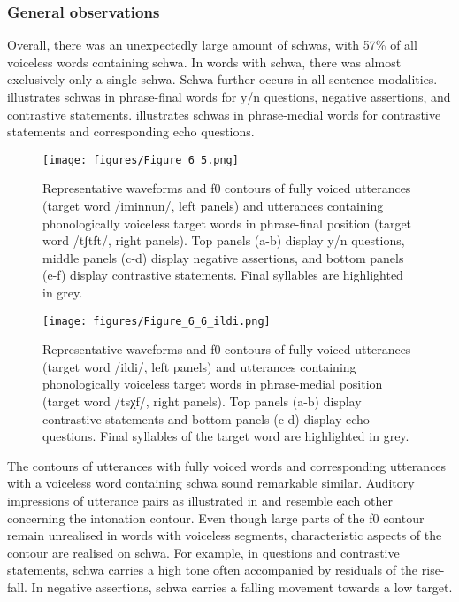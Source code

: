 \subsubsection{General observations}
Overall, there was an unexpectedly large amount of schwas, with 57\% of all voiceless words containing schwa. In words with schwa, there was almost exclusively only a single schwa. Schwa further occurs in all sentence modalities.  illustrates schwas in phrase-final words for y/n questions, negative assertions, and contrastive statements.  illustrates schwas in phrase-medial words for contrastive statements and corresponding echo questions. 

  \begin{figure}
   \texttt{[image: figures/Figure\_6\_5.png]}
  \caption{Representative waveforms and f0 contours of fully voiced utterances (target word /iminnun/, left panels) and utterances containing phonologically voiceless target words in phrase-final position (target word /tʃtft/, right panels). Top panels (a-b) display y/n questions, middle panels (c-d) display negative assertions, and bottom panels (e-f) display contrastive statements. Final syllables are highlighted in grey.}
   \label{fig:6.5}
   \end{figure}

  \begin{figure}
   
   \texttt{[image: figures/Figure\_6\_6\_ildi.png]}
  \caption{Representative waveforms and f0 contours of fully voiced utterances (target word /ildi/, left panels) and utterances containing phonologically voiceless target words in phrase-medial position (target word /tsχf/, right panels). Top panels (a-b) display contrastive statements and bottom panels (c-d) display echo questions. Final syllables of the target word are highlighted in grey.}
   \label{fig:6.6}
   \end{figure}

\newpage    
The contours of utterances with fully voiced words and corresponding utterances with a voiceless word containing schwa sound remarkable similar. Auditory impressions of utterance pairs as illustrated in  and  resemble each other concerning the intonation contour. Even though large parts of the f0 contour remain unrealised in words with voiceless segments, characteristic aspects of the contour are realised on schwa. For example, in questions and contrastive statements, schwa carries a high tone often accompanied by residuals of the rise-fall. In negative assertions, schwa carries a falling movement towards a low target. 

